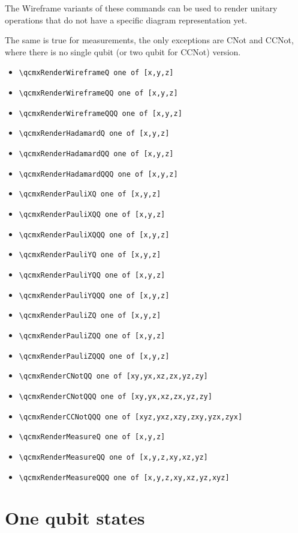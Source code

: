 \documentclass{article}
\begin{document}
The Wireframe variants of these commands can be used to render unitary operations that do not have a specific diagram representation yet.

The same is true for measurements,
the only exceptions are CNot and CCNot, where there is no single qubit (or two qubit for CCNot) version.

\begin{itemize}
  \item \lstinline|\qcmxRenderWireframeQ one of [x,y,z]|
  \item \lstinline|\qcmxRenderWireframeQQ one of [x,y,z]|
  \item \lstinline|\qcmxRenderWireframeQQQ one of [x,y,z]|
  \item \lstinline|\qcmxRenderHadamardQ one of [x,y,z]|
  \item \lstinline|\qcmxRenderHadamardQQ one of [x,y,z]|
  \item \lstinline|\qcmxRenderHadamardQQQ one of [x,y,z]|
  \item \lstinline|\qcmxRenderPauliXQ one of [x,y,z]|
  \item \lstinline|\qcmxRenderPauliXQQ one of [x,y,z]|
  \item \lstinline|\qcmxRenderPauliXQQQ one of [x,y,z]|
  \item \lstinline|\qcmxRenderPauliYQ one of [x,y,z]|
  \item \lstinline|\qcmxRenderPauliYQQ one of [x,y,z]|
  \item \lstinline|\qcmxRenderPauliYQQQ one of [x,y,z]|
  \item \lstinline|\qcmxRenderPauliZQ one of [x,y,z]|
  \item \lstinline|\qcmxRenderPauliZQQ one of [x,y,z]|
  \item \lstinline|\qcmxRenderPauliZQQQ one of [x,y,z]|
  \item \lstinline|\qcmxRenderCNotQQ one of [xy,yx,xz,zx,yz,zy]|
  \item \lstinline|\qcmxRenderCNotQQQ one of [xy,yx,xz,zx,yz,zy]|
  \item \lstinline|\qcmxRenderCCNotQQQ one of [xyz,yxz,xzy,zxy,yzx,zyx]|
  \item \lstinline|\qcmxRenderMeasureQ one of [x,y,z]|
  \item \lstinline|\qcmxRenderMeasureQQ one of [x,y,z,xy,xz,yz]|
  \item \lstinline|\qcmxRenderMeasureQQQ one of [x,y,z,xy,xz,yz,xyz]|
\end{itemize}

\clearpage
\section*{One qubit states}

\begin{center}
  
\end{center}
\end{document}
